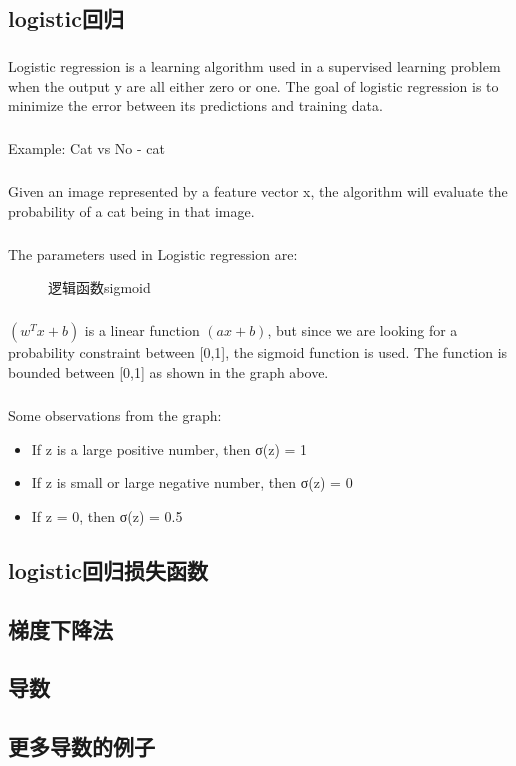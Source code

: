 \documentclass{article}
\begin{document}
\begin{CJK}{UTF8}{gbsn}
\subsection{logistic回归}
\subparagraph{}
Logistic regression is a learning algorithm used in a supervised learning problem when the output y are all either zero or one. The goal of logistic regression is to minimize the error between its predictions and
training data.
\subparagraph{}
Example: Cat vs No - cat
\subparagraph{}
Given an image represented by a feature vector x, the algorithm will evaluate the probability of a cat being in that image.
\begin{figure}[H]
\label{fig:1114}
\end{figure}
\subparagraph{}
The parameters used in Logistic regression are:
\begin{figure}[H]
\label{fig:1115}
\end{figure}
\begin{figure}[H]
\caption{逻辑函数sigmoid}
\label{fig:1116}
\end{figure}
\subparagraph{}
$(w^Tx+b)$ is a linear function $(ax + b)$, but since we are looking for a probability constraint between
[0,1], the sigmoid function is used. The function is bounded between [0,1] as shown in the graph above.
\subparagraph{}
Some observations from the graph:
\begin{itemize}
\item If z is a large positive number, then σ(z) = 1
\item If z is small or large negative number, then σ(z) = 0
\item If z = 0, then σ(z) = 0.5
\end{itemize}
\subsection{logistic回归损失函数}
\subsection{梯度下降法}
\subsection{导数}
\subsection{更多导数的例子}

\end{CJK}
\end{document}
